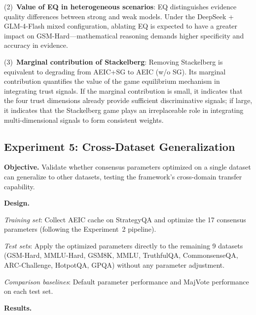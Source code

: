 \documentclass[12pt,a4paper]{article}
\begin{document}
(2)~\textbf{Value of EQ in heterogeneous scenarios}: EQ distinguishes evidence quality differences between strong and weak models. Under the DeepSeek + GLM-4-Flash mixed configuration, ablating EQ is expected to have a greater impact on GSM-Hard---mathematical reasoning demands higher specificity and accuracy in evidence.

(3)~\textbf{Marginal contribution of Stackelberg}: Removing Stackelberg is equivalent to degrading from AEIC+SG to AEIC (w/o SG). Its marginal contribution quantifies the value of the game equilibrium mechanism in integrating trust signals. If the marginal contribution is small, it indicates that the four trust dimensions already provide sufficient discriminative signals; if large, it indicates that the Stackelberg game plays an irreplaceable role in integrating multi-dimensional signals to form consistent weights.

\subsection{Experiment 5: Cross-Dataset Generalization}\label{sec:exp5}

\textbf{Objective.} Validate whether consensus parameters optimized on a single dataset can generalize to other datasets, testing the framework's cross-domain transfer capability.

\textbf{Design.}

\textit{Training set}: Collect AEIC cache on StrategyQA and optimize the 17 consensus parameters (following the Experiment~2 pipeline).

\textit{Test sets}: Apply the optimized parameters directly to the remaining 9 datasets (GSM-Hard, MMLU-Hard, GSM8K, MMLU, TruthfulQA, CommonsenseQA, ARC-Challenge, HotpotQA, GPQA) without any parameter adjustment.

\textit{Comparison baselines}: Default parameter performance and MajVote performance on each test set.

\textbf{Results.}
\end{document}

